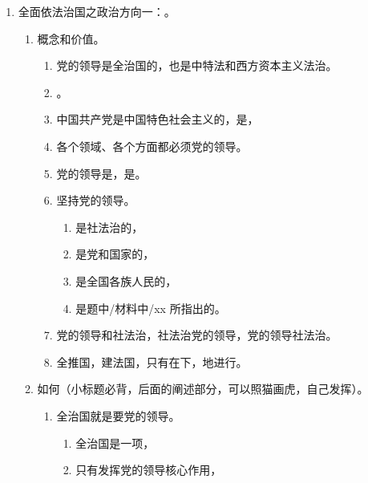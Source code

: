 \begin{enumerate}
\begin{enumerate}
        \end{enumerate}
  \item 全面依法治国之政治方向一：。
        \begin{enumerate}
          \item 概念和价值。
                \begin{enumerate}
                  \item 党的领导是全治国的，也是中特法和西方资本主义法治。
                  \item {}。
                  \item 中国共产党是中国特色社会主义的，是，
                  \item 各个领域、各个方面都必须党的领导。
                  \item 党的领导是，是。
                  \item 坚持党的领导。
                        \begin{enumerate}
                          \item 是社法治的，
                          \item 是党和国家的，
                          \item 是全国各族人民的，
                          \item 是题中/材料中/xx 所指出的。
                        \end{enumerate}
                  \item 党的领导和社法治，社法治党的领导，党的领导社法治。
                  \item 全推国，建法国，只有在下，地进行。
                \end{enumerate}
          \item 如何（小标题必背，后面的阐述部分，可以照猫画虎，自己发挥）。
                \begin{enumerate}
                  \item 全治国就是要党的领导。
                        \begin{enumerate}
                          \item 全治国是一项，
                          \item 只有发挥党的领导核心作用，

\end{enumerate}
\end{enumerate}
\end{enumerate}
\end{enumerate}
